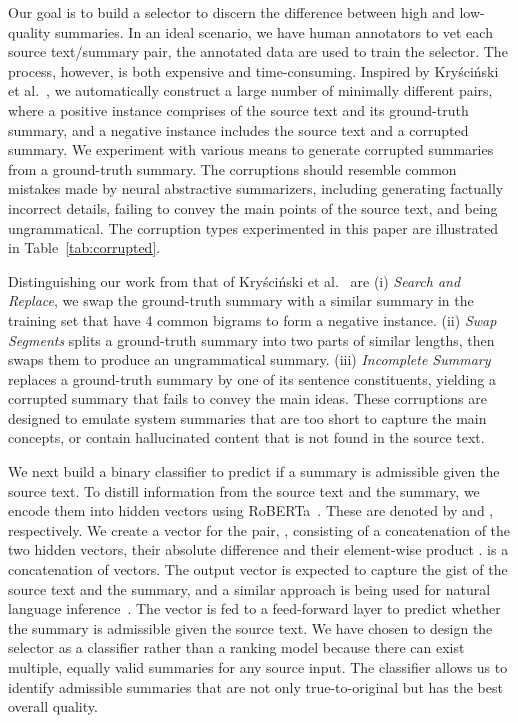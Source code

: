 \documentclass[11pt]{article}
\begin{document}
Our goal is to build a selector to discern the difference between high and low-quality summaries.
In an ideal scenario, we have human annotators to vet each source text/summary pair, the annotated data are used to train the selector. The process, however, is both expensive and time-consuming. 
Inspired by Kryściński et al.~, we automatically construct a large number of minimally different pairs, where a positive instance comprises of the source text and its ground-truth summary, and a negative instance includes the source text and a corrupted summary.
We experiment with various means to generate corrupted summaries from a ground-truth summary. 
The corruptions should resemble common mistakes made by neural abstractive summarizers, including generating factually incorrect details, failing to convey the main points of the source text, and being ungrammatical. 
The corruption types experimented in this paper are illustrated in Table~\ref{tab:corrupted}.


Distinguishing our work from that of Kryściński et al.~ are
(i) \emph{Search and Replace}, we swap the ground-truth summary with a similar summary in the training set that have 4 common bigrams to form a negative instance.
(ii) \emph{Swap Segments} splits a ground-truth summary into two parts of similar lengths, then swaps them to produce an ungrammatical summary.
(iii) \emph{Incomplete Summary} replaces a ground-truth summary by one of its sentence constituents, yielding a corrupted summary that fails to convey the main ideas.
These corruptions are designed to emulate system summaries that are too short to capture the main concepts, or contain hallucinated content that is not found in the source text.


We next build a binary classifier to predict if a summary is admissible given the source text.
To distill information from the source text and the summary, we encode them into hidden vectors using RoBERTa~\cite{liu2019roberta}.
These are denoted by  and , respectively.
We create a vector for the pair,
, 
consisting of a concatenation of the two hidden vectors, their absolute difference  and their element-wise product .
 is a concatenation of vectors.
The output vector  is expected to capture the gist of the source text and the summary,
and a similar approach is being used for natural language inference~\cite{chen-etal-2018-neural}.
The vector  is fed to a feed-forward layer to predict whether the summary is admissible given the source text.
We have chosen to design the selector as a classifier rather than a ranking model because there can exist multiple, equally valid summaries for any source input.
The classifier allows us to identify admissible summaries that are not only true-to-original but has the best overall quality.
\end{document}
